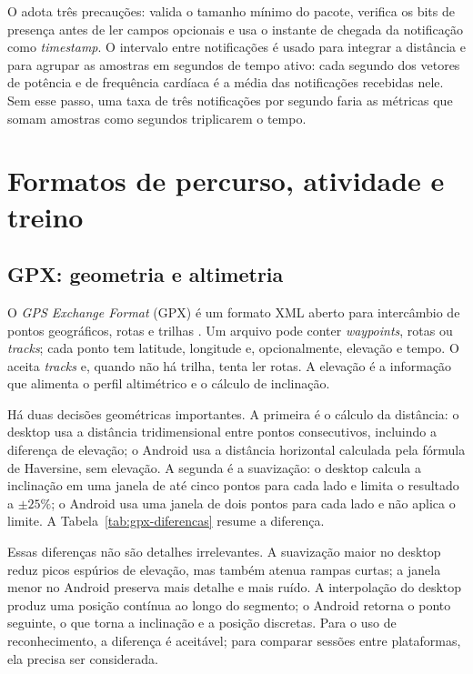 O \argus{} adota três precauções: valida o tamanho mínimo do pacote, verifica
os bits de presença antes de ler campos opcionais e usa o instante de chegada
da notificação como \textit{timestamp}. O intervalo entre notificações é usado
para integrar a distância e para agrupar as amostras em segundos de tempo
ativo: cada segundo dos vetores de potência e de frequência cardíaca é a média
das notificações recebidas nele. Sem esse passo, uma taxa de três notificações
por segundo faria as métricas que somam amostras como segundos triplicarem o
tempo.

\section{Formatos de percurso, atividade e treino}
\label{sec:formatos}

\subsection{GPX: geometria e altimetria}
\label{sec:gpx}

O \textit{GPS Exchange Format} (GPX) é um formato XML aberto para intercâmbio
de pontos geográficos, rotas e trilhas \cite{gpx2004}. Um arquivo pode conter
\textit{waypoints}, rotas ou \textit{tracks}; cada ponto tem latitude, longitude
e, opcionalmente, elevação e tempo. O \argus{} aceita \textit{tracks} e, quando
não há trilha, tenta ler rotas. A elevação é a informação que alimenta o perfil
altimétrico e o cálculo de inclinação.

Há duas decisões geométricas importantes. A primeira é o cálculo da distância:
o desktop usa a distância tridimensional entre pontos consecutivos, incluindo
a diferença de elevação; o Android usa a distância horizontal calculada pela
fórmula de Haversine, sem elevação. A segunda é a suavização: o desktop calcula
a inclinação em uma janela de até cinco pontos para cada lado e limita o
resultado a $\pm 25\%$; o Android usa uma janela de dois pontos para cada lado e
não aplica o limite. A Tabela~\ref{tab:gpx-diferencas} resume a diferença.

Essas diferenças não são detalhes irrelevantes. A suavização maior no desktop
reduz picos espúrios de elevação, mas também atenua rampas curtas; a janela
menor no Android preserva mais detalhe e mais ruído. A interpolação do desktop
produz uma posição contínua ao longo do segmento; o Android retorna o ponto
seguinte, o que torna a inclinação e a posição discretas. Para o uso de
reconhecimento, a diferença é aceitável; para comparar sessões entre
plataformas, ela precisa ser considerada.

